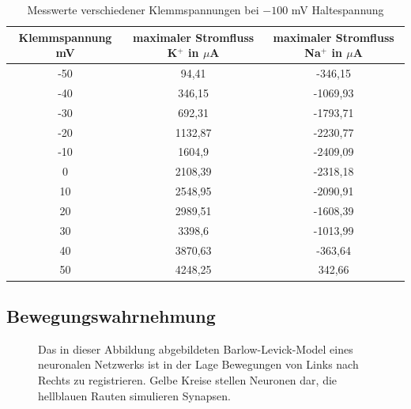 \documentclass[11pt]{article}
\begin{document}
\begin{table}[H]
\caption{Messwerte verschiedener Klemmspannungen bei $-100$ mV Haltespannung}
\centering
\begin{adjustbox}{width=1.3\textwidth, center=\textwidth}
\begin{tabular}{c|c|c}
Klemmspannung mV & maximaler Stromfluss K$^+$ in $\mu$A  & maximaler Stromfluss Na$^+$ in $\mu$A \\
\hline\hline
-50	&	94,41	&	-346,15	\\
-40	&	346,15	&	-1069,93	\\
-30	&	692,31	&	-1793,71	\\
-20	&	1132,87	&	-2230,77	\\
-10	&	1604,9	&	-2409,09	\\
0	&	2108,39	&	-2318,18	\\
10	&	2548,95	&	-2090,91	\\
20	&	2989,51	&	-1608,39	\\
30	&	3398,6	&	-1013,99	\\
40	&	3870,63	&	-363,64	\\
50	&	4248,25	&	342,66	
\end{tabular}
\end{adjustbox}
\label{werte32}
\end{table}

\subsection{Bewegungswahrnehmung}
\begin{figure}[H]
\caption{Das in dieser Abbildung abgebildeten Barlow-Levick-Model eines neuronalen Netzwerks ist in der Lage Bewegungen von Links nach Rechts zu registrieren. Gelbe Kreise stellen Neuronen dar, die hellblauen Rauten simulieren Synapsen.}
\label{bar-lev}
\end{figure}
\end{document}
